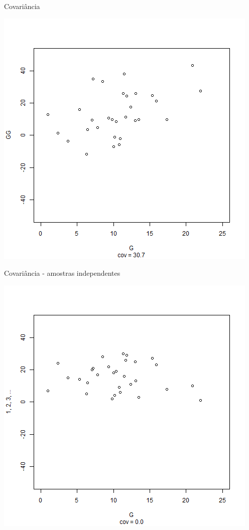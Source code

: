 \documentclass{beamer}
\begin{document}
\begin{frame}{Covariância}
  \begin{center}
    \includegraphics[height=.8\textheight]{Cap17/anim-3}
  \end{center}
\end{frame}

\begin{frame}{Covariância - amostras independentes}
  \begin{center}
    \includegraphics[height=.8\textheight]{Cap17/anim-n}
  \end{center}
\end{frame}
\end{document}
